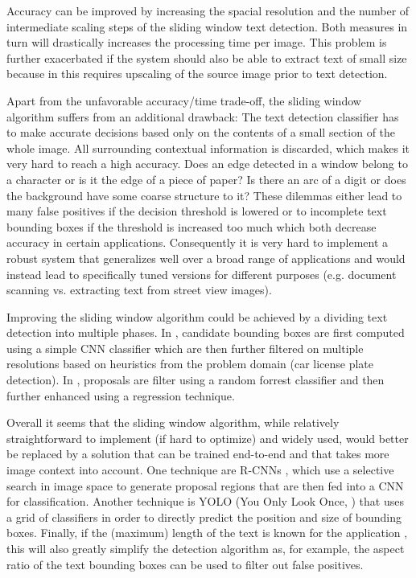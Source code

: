 \documentclass[11pt]{article}
\begin{document}
Accuracy can be improved by increasing the spacial resolution and the number of intermediate scaling steps
of the sliding window text detection.
Both measures in turn will drastically increases the processing time per image. This problem is
further exacerbated if the system should also be able to extract text of small size because in this requires
upscaling of the source image prior to text detection.

Apart from the unfavorable accuracy/time trade-off, the sliding window algorithm suffers from an additional
drawback: The text detection classifier has to make accurate decisions based only on the contents
of a small section of the whole image. All surrounding contextual information is discarded, which
makes it very hard to reach a high accuracy. Does an edge detected in a window belong to a character
or is it the edge of a piece of paper? Is there an arc of a digit or does the background have
some coarse structure to it? These dilemmas either lead to many false positives if the
decision threshold is lowered or to incomplete text bounding boxes if the threshold is increased
too much which both decrease accuracy in certain applications. Consequently it is very hard
to implement a robust system that generalizes well over a broad range of applications and
would instead lead to specifically tuned versions for different purposes
(e.g. document scanning vs. extracting text from street view images).

Improving the sliding window algorithm could be achieved by a dividing text detection into
multiple phases. In \cite{Li2016}, candidate bounding boxes are first computed using a
simple CNN classifier which are then further filtered on multiple resolutions
based on heuristics from the problem domain (car license plate detection). In \cite{Jaderberg2016},
proposals are filter using a random forrest classifier and then further enhanced using a regression
technique.

Overall it seems that the sliding window algorithm, while relatively straightforward to implement
(if hard to optimize) and widely used, would better be replaced by a solution that can be trained
end-to-end and that takes more image context into account. One technique are R-CNNs \cite{Girshick2013,Jaderberg2016},
which use a selective search in image space to generate proposal regions that are then fed
into a CNN for classification. Another technique is YOLO (You Only Look Once, \cite{Redmon}) that
uses a grid of classifiers in order to directly predict the position and size of bounding boxes.
Finally, if the (maximum) length of the text is known for the application \cite{Goodfellow2013,Li2016}, this will also greatly simplify
the detection algorithm as, for example, the aspect ratio of the text bounding boxes can be used
to filter out false positives.



\end{document}
